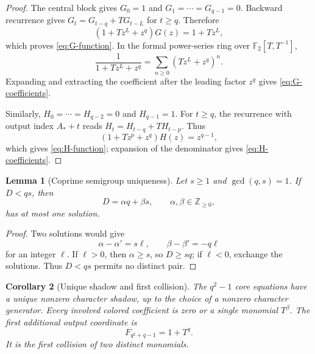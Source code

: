 \documentclass[11pt]{article}
\newcommand{\Z}{\mathbb{Z}}
\newcommand{\F}{\mathbb{F}}
\newtheorem{lemma}{Lemma}[section]
\newtheorem{corollary}[lemma]{Corollary}
\theoremstyle{remark}
\numberwithin{equation}{section}
\begin{document}
\begin{proof}
The central block gives \(G_0=1\) and \(G_1=\cdots=G_{q-1}=0\).  Backward recurrence gives \(G_t=G_{t-q}+T G_{t-L}\) for \(t\geq q\).  Therefore
\[
 (1+Tz^L+z^q)G(z)=1+Tz^L,
\]
which proves \eqref{eq:G-function}.  In the formal power-series ring over \(\F_2[T,T^{-1}]\),
\[
 \frac{1}{1+Tz^L+z^q}
 =\sum_{n\geq0}(Tz^L+z^q)^n.
\]
Expanding and extracting the coefficient after the leading factor \(z^q\) gives \eqref{eq:G-coefficients}.

Similarly, \(H_0=\cdots=H_{q-2}=0\) and \(H_{q-1}=1\).  For \(t\geq q\), the recurrence with output index \(A_\ast+t\) reads \(H_t=H_{t-q}+T H_{t-p}\).  Thus
\[
 (1+Tz^p+z^q)H(z)=z^{q-1},
\]
which gives \eqref{eq:H-function}; expansion of the denominator gives \eqref{eq:H-coefficients}.
\end{proof}

\begin{lemma}[Coprime semigroup uniqueness]\label{lem:semigroup-uniqueness}
Let \(s\geq1\) and \(\gcd(q,s)=1\).  If \(D<qs\), then
\begin{equation}\label{eq:semigroup-representation}
 D=\alpha q+\beta s,\qquad \alpha,\beta\in\Z_{\geq0},
\end{equation}
has at most one solution.
\end{lemma}

\begin{proof}
Two solutions would give
\[
 \alpha-\alpha'=s\ell,\qquad \beta-\beta'=-q\ell
\]
for an integer \(\ell\).  If \(\ell>0\), then \(\alpha\geq s\), so \(D\geq sq\); if \(\ell<0\), exchange the solutions.  Thus \(D<qs\) permits no distinct pair.
\end{proof}

\begin{corollary}[Unique shadow and first collision]\label{cor:unique-shadow}
The \(q^2-1\) core equations have a unique nonzero character shadow, up to the choice of a nonzero character generator.  Every involved colored coefficient is zero or a single monomial \(T^\beta\).  The first additional output coordinate is
\begin{equation}\label{eq:first-collision}
 F_{q^2+q-1}=1+T^q.
\end{equation}
It is the first collision of two distinct monomials.
\end{corollary}
\end{document}
